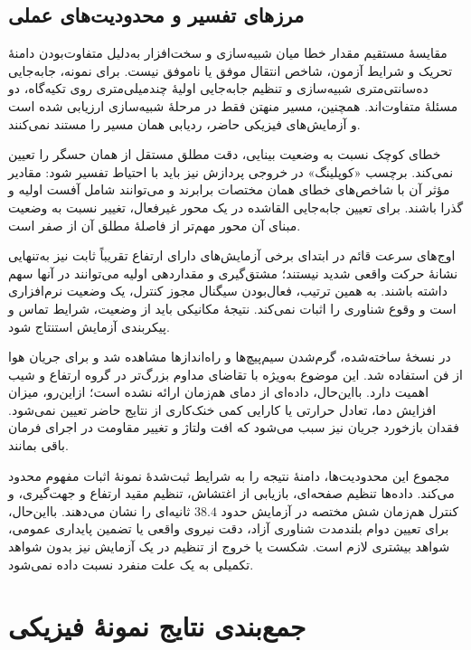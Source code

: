 \subsection{مرزهای تفسیر و محدودیت‌های عملی}
\label{subsec:results-impl-limitations}

مقایسهٔ مستقیم مقدار خطا میان شبیه‌سازی و سخت‌افزار به‌دلیل متفاوت‌بودن دامنهٔ تحریک و شرایط آزمون، شاخص انتقال موفق یا ناموفق نیست. برای نمونه، جابه‌جایی ده‌سانتی‌متری شبیه‌سازی و تنظیم جابه‌جایی اولیهٔ چندمیلی‌متری روی تکیه‌گاه، دو مسئلهٔ متفاوت‌اند. همچنین، مسیر منهتن فقط در مرحلهٔ شبیه‌سازی ارزیابی شده است و آزمایش‌های فیزیکی حاضر، ردیابی همان مسیر را مستند نمی‌کنند.

خطای کوچک نسبت به وضعیت بینایی، دقت مطلق مستقل از همان حسگر را تعیین نمی‌کند. برچسب «کوپلینگ» در خروجی پردازش نیز باید با احتیاط تفسیر شود: مقادیر مؤثر آن با شاخص‌های خطای همان مختصات برابرند و می‌توانند شامل آفست اولیه و گذرا باشند. برای تعیین جابه‌جایی القاشده در یک محور غیرفعال، تغییر نسبت به وضعیت مبنای آن محور مهم‌تر از فاصلهٔ مطلق آن از صفر است.

اوج‌های سرعت قائم در ابتدای برخی آزمایش‌های دارای ارتفاع تقریباً ثابت نیز به‌تنهایی نشانهٔ حرکت واقعی شدید نیستند؛ مشتق‌گیری و مقداردهی اولیه می‌توانند در آنها سهم داشته باشند. به همین ترتیب، فعال‌بودن سیگنال مجوز کنترل، یک وضعیت نرم‌افزاری است و وقوع شناوری را اثبات نمی‌کند. نتیجهٔ مکانیکی باید از وضعیت، شرایط تماس و پیکربندی آزمایش استنتاج شود.

در نسخهٔ ساخته‌شده، گرم‌شدن سیم‌پیچ‌ها و راه‌اندازها مشاهده شد و برای جریان هوا از فن استفاده شد. این موضوع به‌ویژه با تقاضای مداوم بزرگ‌تر در گروه ارتفاع و شیب اهمیت دارد. بااین‌حال، داده‌ای از دمای هم‌زمان ارائه نشده است؛ ازاین‌رو، میزان افزایش دما، تعادل حرارتی یا کارایی کمی خنک‌کاری از نتایج حاضر تعیین نمی‌شود. فقدان بازخورد جریان نیز سبب می‌شود که افت ولتاژ و تغییر مقاومت در اجرای فرمان باقی بمانند.

مجموع این محدودیت‌ها، دامنهٔ نتیجه را به شرایط ثبت‌شدهٔ نمونهٔ اثبات مفهوم محدود می‌کند. داده‌ها تنظیم صفحه‌ای، بازیابی از اغتشاش، تنظیم مقید ارتفاع و جهت‌گیری، و کنترل هم‌زمان شش مختصه در آزمایش حدود $38.4$ ثانیه‌ای را نشان می‌دهند. بااین‌حال، برای تعیین دوام بلندمدت شناوری آزاد، دقت نیروی واقعی یا تضمین پایداری عمومی، شواهد بیشتری لازم است. شکست یا خروج از تنظیم در یک آزمایش نیز بدون شواهد تکمیلی به یک علت منفرد نسبت داده نمی‌شود.

\section{جمع‌بندی نتایج نمونهٔ فیزیکی}
\label{sec:results-impl-summary}

